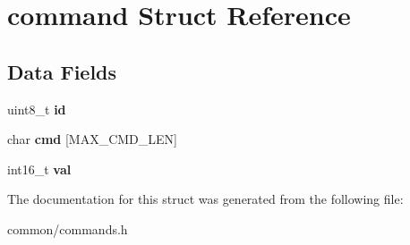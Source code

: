 \section{command Struct Reference}
\label{structcommand}
\subsection*{Data Fields}
\begin{DoxyCompactItemize}
\item 
uint8\-\_\-t {\bfseries id}\label{structcommand_a1e6927fa1486224044e568f9c370519b}

\item 
char {\bfseries cmd} [M\-A\-X\-\_\-\-C\-M\-D\-\_\-\-L\-E\-N]\label{structcommand_a3e55ff27d8b3a69bd168c46d7771a8bc}

\item 
int16\-\_\-t {\bfseries val}\label{structcommand_a6b02c18a02d9a0f81a9bcfd71f294b39}

\end{DoxyCompactItemize}


The documentation for this struct was generated from the following file\-:\begin{DoxyCompactItemize}
\item 
common/commands.\-h\end{DoxyCompactItemize}
